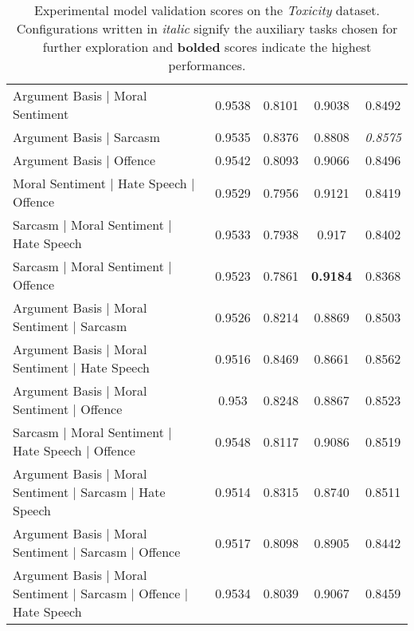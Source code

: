 \begin{table}[h]
{\begin{tabular}{l|cccc}
    Argument Basis | Moral Sentiment                                   & 0.9538          & 0.8101          & 0.9038          & 0.8492          \\
    Argument Basis | Sarcasm                                           & 0.9535          & 0.8376          & 0.8808          & \textit{0.8575} \\
    Argument Basis | Offence                                           & 0.9542          & 0.8093          & 0.9066          & 0.8496          \\
    Moral Sentiment | Hate Speech | Offence                            & 0.9529          & 0.7956          & 0.9121          & 0.8419          \\
    Sarcasm | Moral Sentiment | Hate Speech                            & 0.9533          & 0.7938          & 0.917           & 0.8402          \\
    Sarcasm | Moral Sentiment | Offence                                & 0.9523          & 0.7861          & \textbf{0.9184} & 0.8368          \\
    Argument Basis | Moral Sentiment | Sarcasm                         & 0.9526          & 0.8214          & 0.8869          & 0.8503          \\
    Argument Basis | Moral Sentiment | Hate Speech                     & 0.9516          & 0.8469          & 0.8661          & 0.8562          \\
    Argument Basis | Moral Sentiment | Offence                         & 0.953           & 0.8248          & 0.8867          & 0.8523          \\
    Sarcasm | Moral Sentiment | Hate Speech | Offence                  & 0.9548          & 0.8117          & 0.9086          & 0.8519          \\
    Argument Basis | Moral Sentiment | Sarcasm | Hate Speech           & 0.9514          & 0.8315          & 0.8740          & 0.8511          \\
    Argument Basis | Moral Sentiment | Sarcasm | Offence               & 0.9517          & 0.8098          & 0.8905          & 0.8442          \\
    Argument Basis | Moral Sentiment | Sarcasm | Offence | Hate Speech & 0.9534          & 0.8039          & 0.9067          & 0.8459
  \end{tabular}%
  }
  \caption{Experimental model validation scores on the \textit{Toxicity} dataset. Configurations written in \textit{italic} signify the auxiliary tasks chosen for further exploration and \textbf{bolded} scores indicate the highest performances.}
  \label{tab:mtl_dev_wulczyn}
\end{table}

